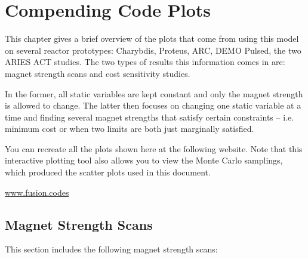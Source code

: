 %
%
%
%
%
%
%
%

\chapter{Compending Code Plots}

\label{chapter:extra}

This chapter gives a brief overview of the plots that come from using this model on several reactor prototypes: Charybdis, Proteus, ARC, DEMO Pulsed, the two ARIES ACT studies. The two types of results this information comes in are: magnet strength scans and cost sensitivity studies.

In the former, all static variables are kept constant and only the magnet strength is allowed to change. The latter then focuses on changing one static variable at a time and finding several magnet strengths that satisfy certain constraints -- i.e. minimum cost or when two limits are both just marginally satisfied.

You can recreate all the plots shown here at the following website. Note that this interactive plotting tool also allows you to view the Monte Carlo samplings, which produced the scatter plots used in this document.

{\centering \href{http://fusion.codes}{www.fusion.codes} \par }

\clearpage

\newpage

\section{Magnet Strength Scans}
\label{section:scans}

This section includes the following magnet strength scans: ~

